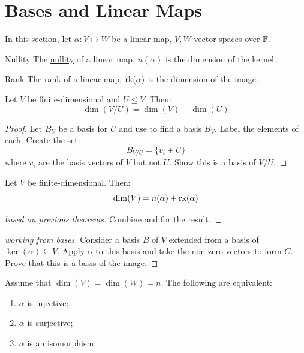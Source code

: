 \documentclass[../Main.tex]{subfiles}
\begin{document}
\section{Bases and Linear Maps}
In this section, let $\alpha : V \mapsto W$ be a linear map, $V, W$ vector spaces over $\mathbb{F}$.
\begin{definition}{Nullity}
    The \underline{nullity} of a linear map, $n(\alpha)$ is the dimension of the kernel.
\end{definition}
\begin{definition}{Rank}
    The \underline{rank} of a linear map, $\operatorname{rk}(\alpha)$ is the dimension of the image.
\end{definition}
\begin{lemma}
    Let $V$ be finite-dimensional and $U \leq V$. Then:
    \begin{equation*}
        \dim(V / U) = \dim(V) - \dim(U)
    \end{equation*}
    \label{lemDimQuotient}
\end{lemma}
\begin{proof}
    Let $B_U$ be a basis for $U$ and use  to find a basis $B_V$. Label the elements of each. Create the set:
    \begin{equation*}
        B_{V / U} = \{v_i + U\}
    \end{equation*}
    where $v_i$ are the basis vectors of $V$ but not $U$. Show this is a basis of $V / U$.
\end{proof}
\begin{theorem}
    Let $V$ be finite-dimensional. Then:
    \begin{equation}
        \dim(V) = n(\alpha) + \operatorname{rk}(\alpha)
        \label{eqnRankNullity}
    \end{equation}
    \label{thmRankNullity}
\end{theorem}
\begin{proof}[based on previous theorems]
    Combine  and  for the result.
\end{proof}
\begin{proof}[working from bases]
    Consider a basis $B$ of $V$ extended from a basis of $\ker(\alpha) \subseteq V$. Apply $\alpha$ to this basis and take the non-zero vectors to form $C$. Prove that this is a basis of the image.
\end{proof}
\begin{corollary}
    Assume that $\dim(V) = \dim(W) = n$. The following are equivalent:
    \begin{enumerate}
        \item $\alpha$ is injective;
        \item $\alpha$ is surjective;
        \item $\alpha$ is an isomorphism.
    \end{enumerate}
    \label{corLinPigeon}
\end{corollary}
\end{document}
